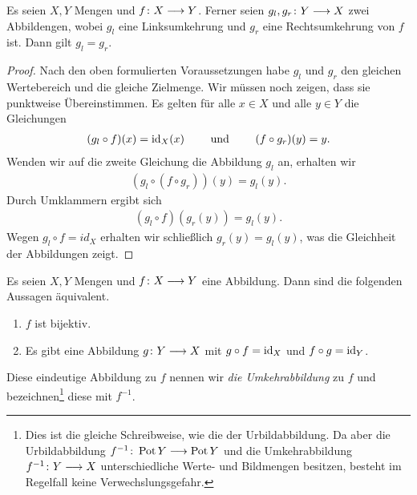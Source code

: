 
\begin{bem}

  Es seien $X, Y$ Mengen und $f\colon X\longrightarrow Y$. Ferner seien
  $g_{l}, g_{r}\colon Y \longrightarrow X$ zwei Abbildengen, wobei $g_{l}$ eine
  Linksumkehrung und $g_{r}$ eine Rechtsumkehrung von $f$ ist. Dann gilt
  $g_{l} = g_{r}$.

  \begin{proof}
    Nach den oben formulierten Voraussetzungen habe $g_{l}$ und $g_{r}$ den
    gleichen Wertebereich und die gleiche Zielmenge. Wir müssen noch
    zeigen, dass sie punktweise Übereinstimmen. Es gelten für alle $x\in X$
    und alle $y\in Y$ die Gleichungen
    \begin{align*}
      (g_{l}\circ f)(x) = \operatorname{id}_{X}(x) \qquad \text{ und } \qquad (f\circ g_{r})(y) = y.
    \end{align*}
    Wenden wir auf die zweite Gleichung die Abbildung $g_{l}$ an, erhalten
    wir
    \begin{align*}
      (g_{l}\circ(f\circ g_{r}))(y) = g_{l}(y).
    \end{align*}
    Durch Umklammern ergibt sich 
    \begin{align*}
      (g_{l}\circ f)(g_{r}(y)) = g_{l}(y).
    \end{align*}
    Wegen $g_{l}\circ f = id_{X}$ erhalten wir schließlich
    $g_{r}(y) = g_{l}(y)$, was die Gleichheit der Abbildungen zeigt.
  \end{proof}
  
\end{bem}


\begin{folg}

  Es seien $X,Y$ Mengen und $f\colon X \longrightarrow Y$ eine Abbildung. Dann sind die
  folgenden Aussagen äquivalent.

  \begin{enumerate}
  \item $f$ ist bijektiv.
  \item Es gibt eine Abbildung $g\colon Y \longrightarrow X$ mit $g\circ f = \operatorname{id}_{X}$
    und $f\circ g = \operatorname{id}_{Y}$.
  \end{enumerate}

  Diese eindeutige Abbildung zu $f$ nennen wir \emph{die Umkehrabbildung}
  zu $f$ und bezeichnen\footnote{Dies ist die gleiche Schreibweise, wie die
    der Urbildabbildung. Da aber die Urbildabbildung
    $f^{-1}\colon \operatorname{Pot}{Y} \longrightarrow \operatorname{Pot}{Y}$ und die Umkehrabbildung
    $f^{-1}\colon Y \longrightarrow X$ unterschiedliche Werte- und Bildmengen besitzen,
    besteht im Regelfall keine Verwechslungsgefahr.} diese mit $f^{-1}$.
  
\end{folg}


